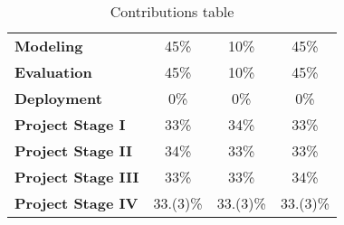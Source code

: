 \begin{table}[h!]
\begin{tabular}{|l||c|c|c|}
    \textbf{Modeling}               & 45\%                                                                     & 10\%                                                                      & 45\%                                                                   \\
    \textbf{Evaluation}             & 45\%                                                                     & 10\%                                                                      & 45\%                                                                   \\
    \textbf{Deployment}             & 0\%                                                                      & 0\%                                                                       & 0\%                                                                    \\
    \midrule
    \textbf{Project Stage I}        & 33\%                                                                     & 34\%                                                                      & 33\%                                                                   \\
    \textbf{Project Stage II}       & 34\%                                                                     & 33\%                                                                      & 33\%                                                                   \\
    \textbf{Project Stage III}      & 33\%                                                                     & 33\%                                                                      & 34\%                                                                   \\
    \textbf{Project Stage IV}       & 33.(3)\%                                                                 & 33.(3)\%                                                                  & 33.(3)\%                                                               \\
    \bottomrule
  \end{tabular}
  \caption{Contributions table}\label{tab:contributions}
\end{table}
%


